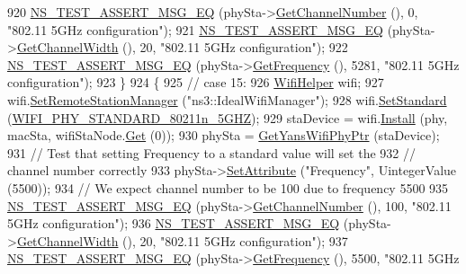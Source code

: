 \begin{DoxyCode}
920     \hyperlink{group__testing_ga2a9d78cffb3db8e867c35fff0b698cf5}{NS\_TEST\_ASSERT\_MSG\_EQ} (phySta->\hyperlink{classns3_1_1WifiPhy_a5cf0ccf06109ace61db51c83e91b7e8d}{GetChannelNumber} (), 0, \textcolor{stringliteral}{"802.11
       5GHz configuration"});
921     \hyperlink{group__testing_ga2a9d78cffb3db8e867c35fff0b698cf5}{NS\_TEST\_ASSERT\_MSG\_EQ} (phySta->\hyperlink{classns3_1_1WifiPhy_a4a5d5009b3b3308f2baeed42a2007189}{GetChannelWidth} (), 20, \textcolor{stringliteral}{"802.11 5GHz
       configuration"});
922     \hyperlink{group__testing_ga2a9d78cffb3db8e867c35fff0b698cf5}{NS\_TEST\_ASSERT\_MSG\_EQ} (phySta->\hyperlink{classns3_1_1WifiPhy_ad2508d94faf22d690d6b8b4367934fd1}{GetFrequency} (), 5281, \textcolor{stringliteral}{"802.11 5GHz
       configuration"});
923   \}
924   \{
925     \textcolor{comment}{// case 15:}
926     \hyperlink{classns3_1_1WifiHelper}{WifiHelper} wifi;
927     wifi.\hyperlink{classns3_1_1WifiHelper_a3d01b178aeb2de246ab5a3aa5638ce24}{SetRemoteStationManager} (\textcolor{stringliteral}{"ns3::IdealWifiManager"});
928     wifi.\hyperlink{classns3_1_1WifiHelper_aa54f3e61527ef8de318d310045bc5dfd}{SetStandard} (\hyperlink{group__wifi_gga1299834f4e1c615af3ca738033b76a49aaabe94a0be4668583c42595437b4a6c0}{WIFI\_PHY\_STANDARD\_80211n\_5GHZ});
929     staDevice = wifi.\hyperlink{classns3_1_1WifiHelper_a451b3d33fa1497c22f06c5451f57a127}{Install} (phy, macSta, wifiStaNode.\hyperlink{classns3_1_1NodeContainer_a9ed96e2ecc22e0f5a3d4842eb9bf90bf}{Get} (0));
930     phySta = \hyperlink{classSetChannelFrequencyTest_aa30a0a39f98c2d825152681ba8b9f4e1}{GetYansWifiPhyPtr} (staDevice);
931     \textcolor{comment}{// Test that setting Frequency to a standard value will set the}
932     \textcolor{comment}{// channel number correctly}
933     phySta->\hyperlink{classns3_1_1ObjectBase_ac60245d3ea4123bbc9b1d391f1f6592f}{SetAttribute} (\textcolor{stringliteral}{"Frequency"}, UintegerValue (5500));
934     \textcolor{comment}{// We expect channel number to be 100 due to frequency 5500}
935     \hyperlink{group__testing_ga2a9d78cffb3db8e867c35fff0b698cf5}{NS\_TEST\_ASSERT\_MSG\_EQ} (phySta->\hyperlink{classns3_1_1WifiPhy_a5cf0ccf06109ace61db51c83e91b7e8d}{GetChannelNumber} (), 100, \textcolor{stringliteral}{"802.11
       5GHz configuration"});
936     \hyperlink{group__testing_ga2a9d78cffb3db8e867c35fff0b698cf5}{NS\_TEST\_ASSERT\_MSG\_EQ} (phySta->\hyperlink{classns3_1_1WifiPhy_a4a5d5009b3b3308f2baeed42a2007189}{GetChannelWidth} (), 20, \textcolor{stringliteral}{"802.11 5GHz
       configuration"});
937     \hyperlink{group__testing_ga2a9d78cffb3db8e867c35fff0b698cf5}{NS\_TEST\_ASSERT\_MSG\_EQ} (phySta->\hyperlink{classns3_1_1WifiPhy_ad2508d94faf22d690d6b8b4367934fd1}{GetFrequency} (), 5500, \textcolor{stringliteral}{"802.11 5GHz
}
\end{DoxyCode}
